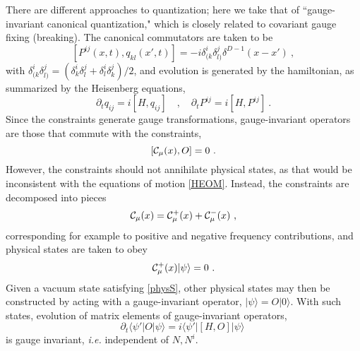 \documentclass[12pt]{article}
\numberwithin{equation}{section}
\newcommand{\calC}{{\cal C}}
\newcommand{\beq}{\begin{equation}}
\newcommand{\eeq}{\end{equation}}
\begin{document}
There are different approaches to quantization; here we take that of ``gauge-invariant canonical quantization," which is closely related to covariant gauge fixing (breaking)\cite{GiPe2}.  The canonical commutators are taken to be
\beq\label{ccrq}
[P^{ij}(x,t),q_{kl}(x',t)] = -i\delta^i_{(k}\delta^j_{l)}  \delta^{D-1}(x-x')\ ,
\eeq
with $\delta^i_{(k}\delta^j_{l)}=(\delta^i_{k}\delta^j_{l} + \delta^i_l\delta^j_{k})/2$, and evolution is generated by the hamiltonian, as summarized by the Heisenberg equations,
\beq\label{HEOM}
\partial_t q_{ij} = i [H,q_{ij}]\quad ,\quad \partial_t P^{ij} = i [H,P^{ij}]\ .
\eeq
Since the constraints generate gauge transformations, gauge-invariant operators are those that commute with the constraints,
\beq\label{concomm}
[\calC_\mu(x),O]=0\ .
\eeq
However, the constraints should not annihilate physical states, as that would be inconsistent with the equations of motion \eqref{HEOM}.  Instead, the constraints are decomposed into pieces
 \beq\label{condec}
\calC_\mu(x)= \calC_\mu^+(x) + \calC_\mu^-(x)\ ,
\eeq
corresponding for example to positive and negative frequency contributions, and physical states are taken to obey
\beq\label{physS}
\calC_\mu^+(x)|\psi\rangle=0\ .
\eeq
Given a vacuum state satisfying \eqref{physS}, other physical states may then be constructed by acting with a gauge-invariant operator, $|\psi\rangle = O|0\rangle$.  With such states, evolution of matrix elements of gauge-invariant operators, 
\beq\label{MEevo}
\partial_t \langle \psi'|O |\psi\rangle = i\langle \psi'|[H,O]|\psi\rangle\ 
\eeq
is gauge invariant, {\it i.e.} independent of $N, N^i$.  
\end{document}
